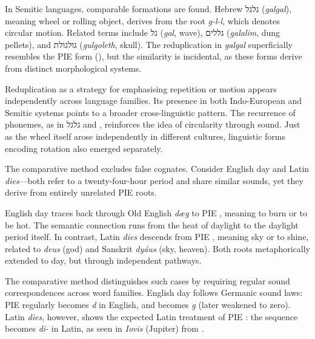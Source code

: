 In Semitic languages, comparable formations are found. Hebrew \texthebrew{גלגל} (\emph{galgal}), meaning \QSOpen{}wheel\QSClose{} or \QSOpen{}rolling object,\QSClose{} derives from the root \emph{g-l-l}, which denotes circular motion. Related terms include \texthebrew{גל} (\emph{gal}, \QSOpen{}wave\QSClose{}), \texthebrew{גללים} (\emph{galalim}, \QSOpen{}dung pellets\QSClose{}), and \texthebrew{גולגולת} (\emph{gulgoleth}, \QSOpen{}skull\QSClose{}). The reduplication in \emph{galgal} superficially resembles the PIE form  (), but the similarity is incidental, as these forms derive from distinct morphological systems.

Reduplication as a strategy for emphasising repetition or motion appears independently across language families. Its presence in both Indo-European and Semitic systems points to a broader cross-linguistic pattern. The recurrence of phonemes, as in \texthebrew{גלגל} and , reinforces the idea of circularity through sound. Just as the wheel itself arose independently in different cultures, linguistic forms encoding rotation also emerged separately.

The comparative method excludes false cognates. Consider English \QSOpen{}day\QSClose{} and Latin \emph{dies}—both refer to a twenty-four-hour period and share similar sounds, yet they derive from entirely unrelated PIE roots.

English \QSOpen{}day\QSClose{} traces back through Old English \emph{dæg} to PIE , meaning \QSOpen{}to burn\QSClose{} or \QSOpen{}to be hot.\QSClose{} The semantic connection runs from the heat of daylight to the daylight period itself. In contrast, Latin \emph{dies} descends from PIE , meaning \QSOpen{}sky\QSClose{} or \QSOpen{}to shine,\QSClose{} related to \emph{deus} (\QSOpen{}god\QSClose{}) and Sanskrit \emph{dyáus} (\QSOpen{}sky, heaven\QSClose{}). Both roots metaphorically extended to \QSOpen{}day,\QSClose{} but through independent pathways.

The comparative method distinguishes such cases by requiring regular sound correspondences across word families. English \QSOpen{}day\QSClose{} follows Germanic sound laws: PIE  regularly becomes \emph{d} in English, and  becomes \emph{g} (later weakened to zero). Latin \emph{dies}, however, shows the expected Latin treatment of PIE : the sequence becomes \emph{di-} in Latin, as seen in \emph{Iovis} (Jupiter) from .

